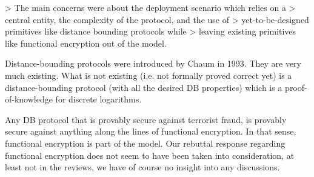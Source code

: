 > The main concerns were about the deployment scenario which relies on a
> central entity, the complexity of the protocol, and the use of
> yet-to-be-designed primitives like distance bounding protocols while
> leaving existing primitives like functional encryption out of the model.

Distance-bounding protocols were introduced by Chaum in 1993. They are 
very much existing. What is not existing (i.e. not formally proved 
correct yet) is a distance-bounding protocol (with all the desired DB 
properties) which is a proof-of-knowledge for discrete logarithms.

Any DB protocol that is provably secure against terrorist fraud, is 
provably secure against anything along the lines of functional 
encryption. In that sense, functional encryption is part of the model. Our rebuttal response regarding functional encryption does not seem to have been taken into consideration, at least not in the reviews, we have of course no insight into any discussions.  

